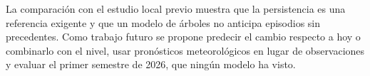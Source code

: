 \documentclass[conference]{IEEEtran}
\begin{document}
La comparación con el estudio local previo muestra que la persistencia es
una referencia exigente y que un modelo de árboles no anticipa episodios
sin precedentes. Como trabajo futuro se propone predecir el cambio
respecto a hoy o combinarlo con el nivel, usar pronósticos meteorológicos
en lugar de observaciones y evaluar el primer semestre de 2026, que ningún
modelo ha visto.





\end{document}
